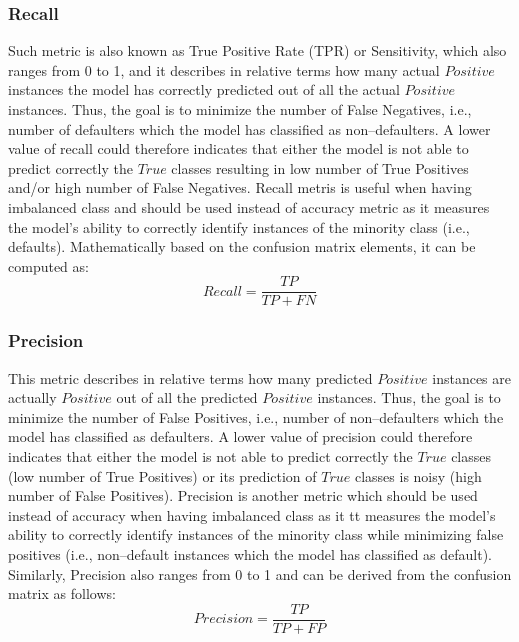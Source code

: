 \subsubsection{Recall}
\label{subsubsec:recall}
Such metric is also known as True Positive Rate (TPR) or Sensitivity, which also ranges from 0 to 1, and it describes in relative terms how many actual $Positive$ instances the model has correctly predicted out of all the actual $Positive$ instances. Thus, the goal is to minimize the number of False Negatives, i.e., number of defaulters which the model has classified as non--defaulters.
A lower value of recall could therefore indicates that either the model is not able to predict correctly the $True$ classes resulting in low number of True Positives and/or high number of False Negatives.
Recall metris is useful when having imbalanced class and should be used instead of accuracy metric as it measures the model's ability to correctly identify instances of the minority class (i.e., defaults).
Mathematically based on the confusion matrix elements, it can be computed as:
\begin{equation}\label{eq}
    Recall = \frac{TP}{TP + FN}
\end{equation}

\subsubsection{Precision}
This metric describes in relative terms how many predicted $Positive$ instances are actually $Positive$ out of all the predicted $Positive$ instances. Thus, the goal is to minimize the number of False Positives, i.e., number of non--defaulters which the model has classified as defaulters.
A lower value of precision could therefore indicates that either the model is not able to predict correctly the $True$ classes (low number of True Positives) or its prediction of $True$ classes is noisy (high number of False Positives).
Precision is another metric which should be used instead of accuracy when having imbalanced class as it tt measures the model's ability to correctly identify instances of the minority class while minimizing false positives (i.e., non--default instances which the model has classified as default).
Similarly, Precision also ranges from 0 to 1 and can be derived from the confusion matrix as follows:
\begin{equation}\label{eq}
    Precision = \frac{TP}{TP + FP}
\end{equation}
